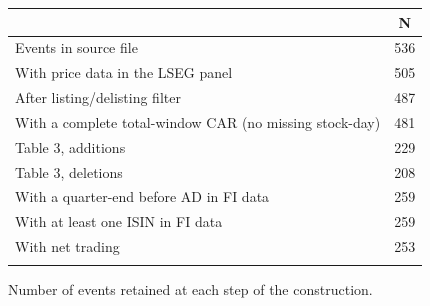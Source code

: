 \begin{threeparttable}
\begingroup
\renewcommand\cellalign{t}
\renewcommand\arraystretch{1}
\setlength{\tabcolsep}{5pt}
\begin{tabular}{@{}lc}
\toprule
 & N \\
\midrule
\addlinespace[1ex]
Events in source file & 536 \\
\addlinespace[0.25ex]
\addlinespace[0.25ex]
With price data in the LSEG panel & 505 \\
\addlinespace[0.25ex]
\addlinespace[0.25ex]
After listing/delisting filter & 487 \\
\addlinespace[0.25ex]
\addlinespace[0.25ex]
With a complete total-window CAR (no missing stock-day) & 481 \\
\addlinespace[0.25ex]
\addlinespace[0.25ex]
Table 3, additions & 229 \\
\addlinespace[0.25ex]
\addlinespace[0.25ex]
Table 3, deletions & 208 \\
\addlinespace[0.25ex]
\addlinespace[0.25ex]
With a quarter-end before AD in FI data & 259 \\
\addlinespace[0.25ex]
\addlinespace[0.25ex]
With at least one ISIN in FI data & 259 \\
\addlinespace[0.25ex]
\addlinespace[0.25ex]
With net trading & 253 \\
\addlinespace[0.25ex]
\bottomrule
\end{tabular}
\endgroup
\noindent\begin{minipage}{\linewidth}\smallskip\footnotesize
Number of events retained at each step of the construction.\end{minipage}

\end{threeparttable}